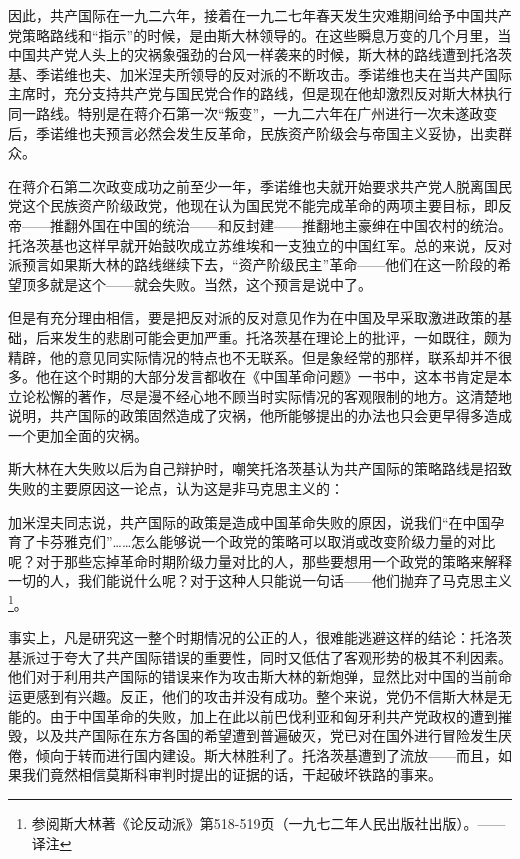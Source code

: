 \documentclass[10pt]{book}
\begin{document}
因此，共产国际在一九二六年，接着在一九二七年春天发生灾难期间给予中国共产党策略路线和“指示”的时候，是由斯大林领导的。在这些瞬息万变的几个月里，当中国共产党人头上的灾祸象强劲的台风一样袭来的时候，斯大林的路线遭到托洛茨基、季诺维也夫、加米涅夫所领导的反对派的不断攻击。季诺维也夫在当共产国际主席时，充分支持共产党与国民党合作的路线，但是现在他却激烈反对斯大林执行同一路线。特别是在蒋介石第一次“叛变”，一九二六年在广州进行一次未遂政变后，季诺维也夫预言必然会发生反革命，民族资产阶级会与帝国主义妥协，出卖群众。

在蒋介石第二次政变成功之前至少一年，季诺维也夫就开始要求共产党人脱离国民党这个民族资产阶级政党，他现在认为国民党不能完成革命的两项主要目标，即反帝——推翻外国在中国的统治——和反封建——推翻地主豪绅在中国农村的统治。托洛茨基也这样早就开始鼓吹成立苏维埃和一支独立的中国红军。总的来说，反对派预言如果斯大林的路线继续下去，“资产阶级民主”革命——他们在这一阶段的希望顶多就是这个——就会失败。当然，这个预言是说中了。

但是有充分理由相信，要是把反对派的反对意见作为在中国及早采取激进政策的基础，后来发生的悲剧可能会更加严重。托洛茨基在理论上的批评，一如既往，颇为精辟，他的意见同实际情况的特点也不无联系。但是象经常的那样，联系却并不很多。他在这个时期的大部分发言都收在《中国革命问题》一书中，这本书肯定是本立论松懈的著作，尽是漫不经心地不顾当时实际情况的客观限制的地方。这清楚地说明，共产国际的政策固然造成了灾祸，他所能够提出的办法也只会更早得多造成一个更加全面的灾祸。

斯大林在大失败以后为自己辩护时，嘲笑托洛茨基认为共产国际的策略路线是招致失败的主要原因这一论点，认为这是非马克思主义的：

加米涅夫同志说，共产国际的政策是造成中国革命失败的原因，说我们“在中国孕育了卡芬雅克们”……怎么能够说一个政党的策略可以取消或改变阶级力量的对比呢？对于那些忘掉革命时期阶级力量对比的人，那些要想用一个政党的策略来解释一切的人，我们能说什么呢？对于这种人只能说一句话——他们抛弃了马克思主义\footnote{参阅斯大林著《论反动派》第518-519页（一九七二年人民出版社出版）。——译注}。

事实上，凡是研究这一整个时期情况的公正的人，很难能逃避这样的结论：托洛茨基派过于夸大了共产国际错误的重要性，同时又低估了客观形势的极其不利因素。他们对于利用共产国际的错误来作为攻击斯大林的新炮弹，显然比对中国的当前命运更感到有兴趣。反正，他们的攻击并没有成功。整个来说，党仍不信斯大林是无能的。由于中国革命的失败，加上在此以前巴伐利亚和匈牙利共产党政权的遭到摧毁，以及共产国际在东方各国的希望遭到普遍破灭，党已对在国外进行冒险发生厌倦，倾向于转而进行国内建设。斯大林胜利了。托洛茨基遭到了流放——而且，如果我们竟然相信莫斯科审判时提出的证据的话，干起破坏铁路的事来。
\end{document}
